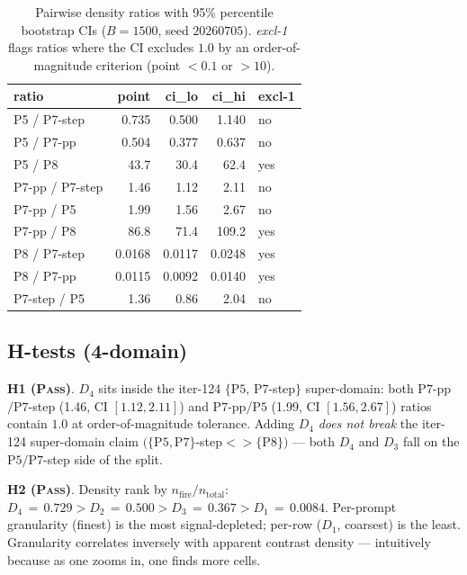 \begin{table}[h]
\centering\small
\caption{Pairwise density ratios with 95\% percentile bootstrap CIs
($B{=}1500$, seed $20260705$). \emph{excl-1} flags ratios where the
CI excludes $1.0$ by an order-of-magnitude criterion (point $< 0.1$
or $> 10$).}
\label{tab:synth-four-domain-ratios}
\begin{tabular}{lrrrl}
\toprule
ratio                       & point   & ci\_lo  & ci\_hi  & excl-1 \\
\midrule
P5 / P7-step                & 0.735   & 0.500   & 1.140   & no  \\
P5 / P7-pp                  & 0.504   & 0.377   & 0.637   & no  \\
P5 / P8                     & 43.7    & 30.4    & 62.4    & yes \\
P7-pp / P7-step             & 1.46    & 1.12    & 2.11    & no  \\
P7-pp / P5                  & 1.99    & 1.56    & 2.67    & no  \\
P7-pp / P8                  & 86.8    & 71.4    & 109.2   & yes \\
P8 / P7-step                & 0.0168  & 0.0117  & 0.0248  & yes \\
P8 / P7-pp                  & 0.0115  & 0.0092  & 0.0140  & yes \\
P7-step / P5                & 1.36    & 0.86    & 2.04    & no  \\
\bottomrule
\end{tabular}
\end{table}

\subsection{H-tests (4-domain)}

\textbf{H1 (\textsc{Pass})}. $D_4$ sits inside the iter-124
$\{\mathrm{P5},\,\mathrm{P7}$-step$\}$ super-domain: both
$\mathrm{P7}$-pp$/\mathrm{P7}$-step (1.46, CI $[1.12,2.11]$) and
$\mathrm{P7}$-pp$/\mathrm{P5}$ (1.99, CI $[1.56,2.67]$) ratios
contain $1.0$ at order-of-magnitude tolerance. Adding
$D_4$ \emph{does not break} the iter-124 super-domain claim
$(\{\mathrm{P5},\mathrm{P7}\}$-step$<\!\!> \{\mathrm{P8}\})$ — both
$D_4$ and $D_3$ fall on the $\mathrm{P5}/\mathrm{P7}$-step side of
the split.

\textbf{H2 (\textsc{Pass})}. Density rank by $n_{\mathrm{fire}} /
n_{\mathrm{total}}$: $D_4 \,=\, 0.729 > D_2 \,=\, 0.500 > D_3 \,=\,
0.367 > D_1 \,=\, 0.0084$. Per-prompt granularity (finest) is the
most signal-depleted; per-row ($D_1$, coarsest) is the least.
Granularity correlates inversely with apparent contrast density —
intuitively because as one zooms in, one finds more cells.

